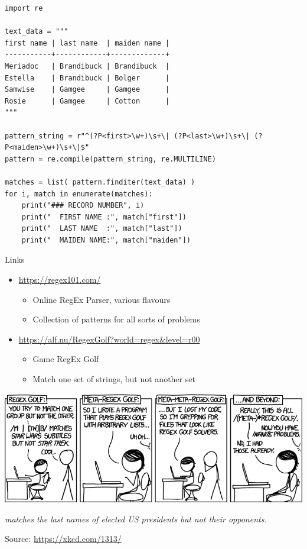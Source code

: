 
\begin{frame}[fragile]
%
\vspace{-6pt}
\begin{codebox}
\begin{verbatim}
import re

text_data = """
first name | last name  | maiden name |
-----------+------------+-------------+
Meriadoc   | Brandibuck | Brandibuck  |
Estella    | Brandibuck | Bolger      |
Samwise    | Gamgee     | Gamgee      |
Rosie      | Gamgee     | Cotton      |
"""

pattern_string = r"^(?P<first>\w+)\s+\| (?P<last>\w+)\s+\| (?P<maiden>\w+)\s+\|$"
pattern = re.compile(pattern_string, re.MULTILINE)

matches = list( pattern.finditer(text_data) )
for i, match in enumerate(matches):
    print("### RECORD NUMBER", i)
    print("  FIRST NAME :", match["first"])
    print("  LAST NAME  :", match["last"])
    print("  MAIDEN NAME:", match["maiden"])
\end{verbatim}
\end{codebox}
\end{frame}


\begin{frame}{Links}
%
\begin{itemize}
\item \url{https://regex101.com/}
	\begin{itemize}
	\item Online RegEx Parser, various flavours
	\item Collection of patterns for all sorts of problems
	\end{itemize}
\item \url{https://alf.nu/RegexGolf?world=regex&level=r00}
	\begin{itemize}
	\item Game RegEx Golf
	\item Match one set of strings, but not another set
	\end{itemize}
\end{itemize}
%
\begin{center}
\includegraphics[width=.5\linewidth]{./gfx/19-xkcd-regex_golf}
\end{center}
\footnotesize
\emph{ matches the last names of elected US presidents but not their opponents.}

Source: \url{https://xkcd.com/1313/}
%
\end{frame}

